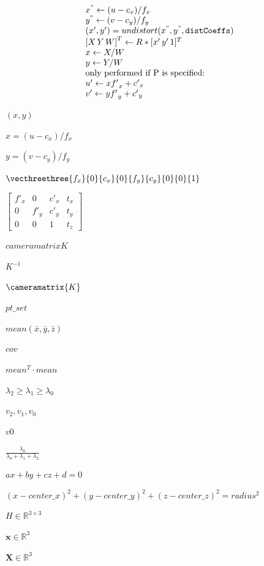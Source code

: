 \documentclass{article}
\begin{document}
\[\begin{array}{l}
x^{"}  \leftarrow (u - c_x)/f_x  \\
y^{"}  \leftarrow (v - c_y)/f_y  \\
(x',y') = undistort(x^{"},y^{"}, \texttt{distCoeffs}) \\
{[X\,Y\,W]} ^T  \leftarrow R*[x' \, y' \, 1]^T  \\
x  \leftarrow X/W  \\
y  \leftarrow Y/W  \\
\text{only performed if P is specified:} \\
u'  \leftarrow x {f'}_x + {c'}_x  \\
v'  \leftarrow y {f'}_y + {c'}_y
\end{array}
\]
\pagebreak

$(x, y)$
\pagebreak

$x = (u - c_x) / f_x$
\pagebreak

$y = (v - c_y) / f_y$
\pagebreak

$\vecthreethree{f_x}{0}{c_x}{0}{f_y}{c_y}{0}{0}{1}$
\pagebreak

$\begin{bmatrix} {f'}_x & 0 & {c'}_x & t_x \\ 0 & {f'}_y & {c'}_y & t_y \\ 0 & 0 & 1 & t_z \end{bmatrix}$
\pagebreak

$cameramatrix{K}$
\pagebreak

$K^{-1}$
\pagebreak

$\cameramatrix{K}$
\pagebreak

$ pt\_set $
\pagebreak

$ mean(\bar{x},\bar{y},\bar{z}) $
\pagebreak

$ cov $
\pagebreak

$ mean^T \cdot mean $
\pagebreak

$ λ_2 \ge λ_1 \ge λ_0 $
\pagebreak

$ v_2, v_1, v_0 $
\pagebreak

$ v0 $
\pagebreak

$ \frac{λ_0}{λ_0 + λ_1 + λ_2} $
\pagebreak

$ ax + by + cz + d = 0 $
\pagebreak

$ (x - center\_x)^2 + (y - center\_y)^2 + (z - center\_z)^2 = radius^2 $
\pagebreak

$H\in \mathbb{R}^{3\times 3}$
\pagebreak

$\mathbf{x} \in \mathbb{R}^3$
\pagebreak

$\mathbf{X} \in \mathbb{R}^3$
\pagebreak
\end{document}
